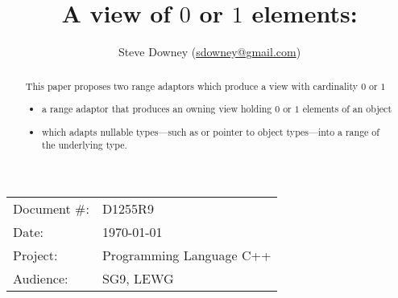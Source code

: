 \documentclass[a4paper,10pt,oneside,openany,final,article]{memoir}
\begin{document}
\title{A view of $0$ or $1$ elements: }
\author{
Steve Downey \small(\href{mailto:sdowney@gmail.com}{sdowney@gmail.com}) \\
}
\date{} %
\maketitle

\begin{flushright}
\begin{tabular}{ll}
  Document \#: & D1255R9 \\
  Date: & \today \\
  Project: & Programming Language C++ \\
  Audience: & SG9, LEWG
\end{tabular}
\end{flushright}

\begin{abstract}
  This paper proposes two range adaptors which produce a view with cardinality $0$ or $1$
  \begin{itemize}
  \item
     a range adaptor that produces an owning view holding $0$ or $1$ elements of an object
  \item
     which adapts nullable types---such as  or pointer to object types---into a range of the underlying type.
  \end{itemize}
\end{abstract}

\tableofcontents*
\end{document}
